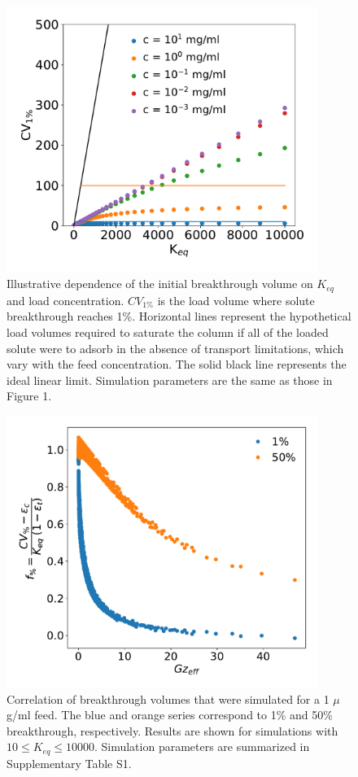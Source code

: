 \documentclass[11pt,a4paper]{article}
\begin{document}
\begin{figure}[bp]
    \centering
    \includegraphics[width=0.9\textwidth]{figure_2}
    \caption{Illustrative dependence of the initial breakthrough volume on $K_{eq}$ and load concentration. $CV_{1\%}$ is the load volume where solute breakthrough reaches 1\%. Horizontal lines represent the hypothetical load volumes required to saturate the column if all of the loaded solute were to adsorb in the absence of transport limitations, which vary with the feed concentration. The solid black line represents the ideal linear limit. Simulation parameters are the same as those in Figure 1.}
    \label{fig:initial breakthrough volumes vs Keq}
\end{figure}


\begin{figure}[bp]
    \centering
    \includegraphics[width=0.9\textwidth]{figure_3}
    \caption{Correlation of breakthrough volumes that were simulated for a 1 $\mu$g/ml feed. The blue and orange series correspond to 1\% and 50\% breakthrough, respectively. Results are shown for simulations with $10 \leq K_{eq} \leq 10000$. Simulation parameters are summarized in Supplementary Table S1.}
    \label{fig:correlation of breakthrough volumes}
\end{figure}
\end{document}
